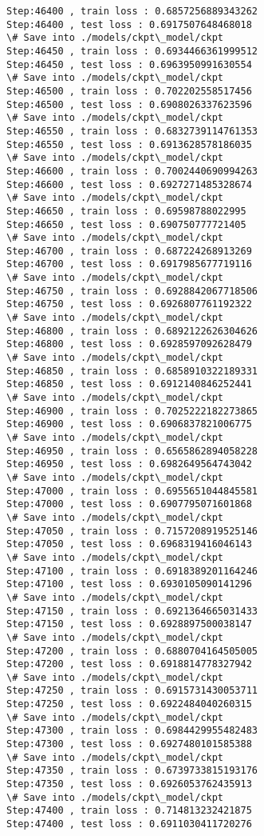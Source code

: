 \documentclass[11pt]{article}
\begin{document}
\begin{Verbatim}[commandchars=\\\{\}]
Step:46400 , train loss : 0.6857256889343262
Step:46400 , test loss : 0.6917507648468018
\# Save into ./models/ckpt\_model/ckpt
Step:46450 , train loss : 0.6934466361999512
Step:46450 , test loss : 0.6963950991630554
\# Save into ./models/ckpt\_model/ckpt
Step:46500 , train loss : 0.702202558517456
Step:46500 , test loss : 0.6908026337623596
\# Save into ./models/ckpt\_model/ckpt
Step:46550 , train loss : 0.6832739114761353
Step:46550 , test loss : 0.6913628578186035
\# Save into ./models/ckpt\_model/ckpt
Step:46600 , train loss : 0.7002440690994263
Step:46600 , test loss : 0.6927271485328674
\# Save into ./models/ckpt\_model/ckpt
Step:46650 , train loss : 0.69598788022995
Step:46650 , test loss : 0.690750777721405
\# Save into ./models/ckpt\_model/ckpt
Step:46700 , train loss : 0.687224268913269
Step:46700 , test loss : 0.6917985677719116
\# Save into ./models/ckpt\_model/ckpt
Step:46750 , train loss : 0.6928842067718506
Step:46750 , test loss : 0.6926807761192322
\# Save into ./models/ckpt\_model/ckpt
Step:46800 , train loss : 0.6892122626304626
Step:46800 , test loss : 0.6928597092628479
\# Save into ./models/ckpt\_model/ckpt
Step:46850 , train loss : 0.6858910322189331
Step:46850 , test loss : 0.6912140846252441
\# Save into ./models/ckpt\_model/ckpt
Step:46900 , train loss : 0.7025222182273865
Step:46900 , test loss : 0.6906837821006775
\# Save into ./models/ckpt\_model/ckpt
Step:46950 , train loss : 0.6565862894058228
Step:46950 , test loss : 0.6982649564743042
\# Save into ./models/ckpt\_model/ckpt
Step:47000 , train loss : 0.6955651044845581
Step:47000 , test loss : 0.6907795071601868
\# Save into ./models/ckpt\_model/ckpt
Step:47050 , train loss : 0.7157208919525146
Step:47050 , test loss : 0.6968319416046143
\# Save into ./models/ckpt\_model/ckpt
Step:47100 , train loss : 0.6918389201164246
Step:47100 , test loss : 0.6930105090141296
\# Save into ./models/ckpt\_model/ckpt
Step:47150 , train loss : 0.6921364665031433
Step:47150 , test loss : 0.6928897500038147
\# Save into ./models/ckpt\_model/ckpt
Step:47200 , train loss : 0.6880704164505005
Step:47200 , test loss : 0.6918814778327942
\# Save into ./models/ckpt\_model/ckpt
Step:47250 , train loss : 0.6915731430053711
Step:47250 , test loss : 0.6922484040260315
\# Save into ./models/ckpt\_model/ckpt
Step:47300 , train loss : 0.6984429955482483
Step:47300 , test loss : 0.6927480101585388
\# Save into ./models/ckpt\_model/ckpt
Step:47350 , train loss : 0.6739733815193176
Step:47350 , test loss : 0.6926053762435913
\# Save into ./models/ckpt\_model/ckpt
Step:47400 , train loss : 0.714813232421875
Step:47400 , test loss : 0.6911030411720276

\end{Verbatim}
\end{document}
